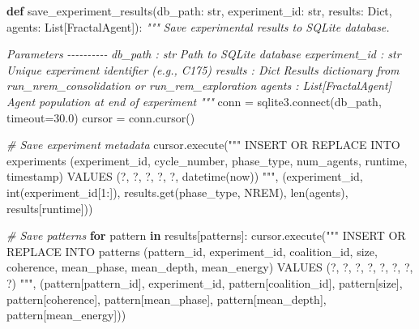 \documentclass[
]{article}
\newenvironment{Shaded}{}{}
\newcommand{\BuiltInTok}[1]{\textcolor[rgb]{0.00,0.50,0.00}{#1}}
\newcommand{\CommentTok}[1]{\textcolor[rgb]{0.38,0.63,0.69}{\textit{#1}}}
\newcommand{\ControlFlowTok}[1]{\textcolor[rgb]{0.00,0.44,0.13}{\textbf{#1}}}
\newcommand{\DecValTok}[1]{\textcolor[rgb]{0.25,0.63,0.44}{#1}}
\newcommand{\ExtensionTok}[1]{#1}
\newcommand{\FloatTok}[1]{\textcolor[rgb]{0.25,0.63,0.44}{#1}}
\newcommand{\KeywordTok}[1]{\textcolor[rgb]{0.00,0.44,0.13}{\textbf{#1}}}
\newcommand{\NormalTok}[1]{#1}
\newcommand{\OperatorTok}[1]{\textcolor[rgb]{0.40,0.40,0.40}{#1}}
\newcommand{\StringTok}[1]{\textcolor[rgb]{0.25,0.44,0.63}{#1}}
\begin{document}
\begin{Shaded}
\begin{Highlighting}[]
\KeywordTok{def}\NormalTok{ save\_experiment\_results(db\_path: }\BuiltInTok{str}\NormalTok{,}
\NormalTok{                           experiment\_id: }\BuiltInTok{str}\NormalTok{,}
\NormalTok{                           results: Dict,}
\NormalTok{                           agents: List[FractalAgent]):}
    \CommentTok{"""}
\CommentTok{    Save experimental results to SQLite database.}

\CommentTok{    Parameters}
\CommentTok{    {-}{-}{-}{-}{-}{-}{-}{-}{-}{-}}
\CommentTok{    db\_path : str}
\CommentTok{        Path to SQLite database}
\CommentTok{    experiment\_id : str}
\CommentTok{        Unique experiment identifier (e.g., \textquotesingle{}C175\textquotesingle{})}
\CommentTok{    results : Dict}
\CommentTok{        Results dictionary from run\_nrem\_consolidation or run\_rem\_exploration}
\CommentTok{    agents : List[FractalAgent]}
\CommentTok{        Agent population at end of experiment}
\CommentTok{    """}
\NormalTok{    conn }\OperatorTok{=}\NormalTok{ sqlite3.}\ExtensionTok{connect}\NormalTok{(db\_path, timeout}\OperatorTok{=}\FloatTok{30.0}\NormalTok{)}
\NormalTok{    cursor }\OperatorTok{=}\NormalTok{ conn.cursor()}

    \CommentTok{\# Save experiment metadata}
\NormalTok{    cursor.execute(}\StringTok{"""}
\StringTok{        INSERT OR REPLACE INTO experiments}
\StringTok{        (experiment\_id, cycle\_number, phase\_type, num\_agents, runtime, timestamp)}
\StringTok{        VALUES (?, ?, ?, ?, ?, datetime(\textquotesingle{}now\textquotesingle{}))}
\StringTok{    """}\NormalTok{, (experiment\_id, }\BuiltInTok{int}\NormalTok{(experiment\_id[}\DecValTok{1}\NormalTok{:]), results.get(}\StringTok{\textquotesingle{}phase\_type\textquotesingle{}}\NormalTok{, }\StringTok{\textquotesingle{}NREM\textquotesingle{}}\NormalTok{),}
          \BuiltInTok{len}\NormalTok{(agents), results[}\StringTok{\textquotesingle{}runtime\textquotesingle{}}\NormalTok{]))}

    \CommentTok{\# Save patterns}
    \ControlFlowTok{for}\NormalTok{ pattern }\KeywordTok{in}\NormalTok{ results[}\StringTok{\textquotesingle{}patterns\textquotesingle{}}\NormalTok{]:}
\NormalTok{        cursor.execute(}\StringTok{"""}
\StringTok{            INSERT OR REPLACE INTO patterns}
\StringTok{            (pattern\_id, experiment\_id, coalition\_id, size, coherence,}
\StringTok{             mean\_phase, mean\_depth, mean\_energy)}
\StringTok{            VALUES (?, ?, ?, ?, ?, ?, ?, ?)}
\StringTok{        """}\NormalTok{, (pattern[}\StringTok{\textquotesingle{}pattern\_id\textquotesingle{}}\NormalTok{], experiment\_id, pattern[}\StringTok{\textquotesingle{}coalition\_id\textquotesingle{}}\NormalTok{],}
\NormalTok{              pattern[}\StringTok{\textquotesingle{}size\textquotesingle{}}\NormalTok{], pattern[}\StringTok{\textquotesingle{}coherence\textquotesingle{}}\NormalTok{], pattern[}\StringTok{\textquotesingle{}mean\_phase\textquotesingle{}}\NormalTok{],}
\NormalTok{              pattern[}\StringTok{\textquotesingle{}mean\_depth\textquotesingle{}}\NormalTok{], pattern[}\StringTok{\textquotesingle{}mean\_energy\textquotesingle{}}\NormalTok{]))}


\end{Highlighting}
\end{Shaded}
\end{document}
